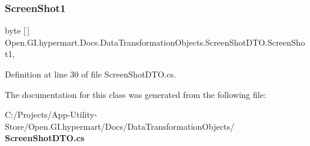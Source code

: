 \subsubsection{Screen\+Shot1}
{\footnotesize\ttfamily byte [$\,$] Open.\+G\+I.\+hypermart.\+Docs.\+Data\+Transformation\+Objects.\+Screen\+Shot\+D\+T\+O.\+Screen\+Shot1\hspace{0.3cm}{\ttfamily [get]}, {\ttfamily [set]}}







Definition at line 30 of file Screen\+Shot\+D\+T\+O.\+cs.



The documentation for this class was generated from the following file\+:\begin{DoxyCompactItemize}
\item 
C\+:/\+Projects/\+App-\/\+Utility-\/\+Store/\+Open.\+G\+I.\+hypermart/\+Docs/\+Data\+Transformation\+Objects/\textbf{ Screen\+Shot\+D\+T\+O.\+cs}\end{DoxyCompactItemize}
